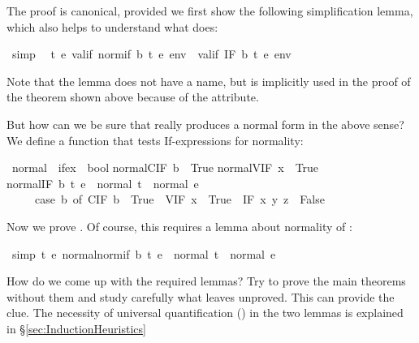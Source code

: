 \begin{isabellebody}
\isamarkupfalse%
%
\begin{isamarkuptext}%
\noindent
The proof is canonical, provided we first show the following simplification
lemma, which also helps to understand what  does:%
\end{isamarkuptext}%
\isamarkuptrue%
\ {\isacharbrackleft}simp{\isacharbrackright}{\isacharcolon}\isanewline
\ \ {\isachardoublequote}{\isasymforall}t\ e{\isachardot}\ valif\ {\isacharparenleft}normif\ b\ t\ e{\isacharparenright}\ env\ {\isacharequal}\ valif\ {\isacharparenleft}IF\ b\ t\ e{\isacharparenright}\ env{\isachardoublequote}\isamarkupfalse%
\isamarkupfalse%
\isamarkupfalse%
\isamarkupfalse%
\isamarkupfalse%
\isamarkupfalse%
%
\begin{isamarkuptext}%
\noindent
Note that the lemma does not have a name, but is implicitly used in the proof
of the theorem shown above because of the  attribute.

But how can we be sure that  really produces a normal form in
the above sense? We define a function that tests If-expressions for normality:%
\end{isamarkuptext}%
\isamarkuptrue%
\ normal\ {\isacharcolon}{\isacharcolon}\ {\isachardoublequote}ifex\ {\isasymRightarrow}\ bool{\isachardoublequote}\isanewline
\isamarkupfalse%
\isanewline
{\isachardoublequote}normal{\isacharparenleft}CIF\ b{\isacharparenright}\ {\isacharequal}\ True{\isachardoublequote}\isanewline
{\isachardoublequote}normal{\isacharparenleft}VIF\ x{\isacharparenright}\ {\isacharequal}\ True{\isachardoublequote}\isanewline
{\isachardoublequote}normal{\isacharparenleft}IF\ b\ t\ e{\isacharparenright}\ {\isacharequal}\ {\isacharparenleft}normal\ t\ {\isasymand}\ normal\ e\ {\isasymand}\isanewline
\ \ \ \ \ {\isacharparenleft}case\ b\ of\ CIF\ b\ {\isasymRightarrow}\ True\ {\isacharbar}\ VIF\ x\ {\isasymRightarrow}\ True\ {\isacharbar}\ IF\ x\ y\ z\ {\isasymRightarrow}\ False{\isacharparenright}{\isacharparenright}{\isachardoublequote}\isamarkupfalse%
%
\begin{isamarkuptext}%
\noindent
Now we prove . Of course, this requires a lemma about
normality of :%
\end{isamarkuptext}%
\isamarkuptrue%
\ {\isacharbrackleft}simp{\isacharbrackright}{\isacharcolon}\ {\isachardoublequote}{\isasymforall}t\ e{\isachardot}\ normal{\isacharparenleft}normif\ b\ t\ e{\isacharparenright}\ {\isacharequal}\ {\isacharparenleft}normal\ t\ {\isasymand}\ normal\ e{\isacharparenright}{\isachardoublequote}\isamarkupfalse%
\isamarkupfalse%
\isamarkupfalse%
\isamarkupfalse%
\isamarkupfalse%
\isamarkupfalse%
%
\begin{isamarkuptext}%
\medskip
How do we come up with the required lemmas? Try to prove the main theorems
without them and study carefully what  leaves unproved. This 
can provide the clue.  The necessity of universal quantification
() in the two lemmas is explained in
\S\ref{sec:InductionHeuristics}


\end{isamarkuptext}
\end{isabellebody}
